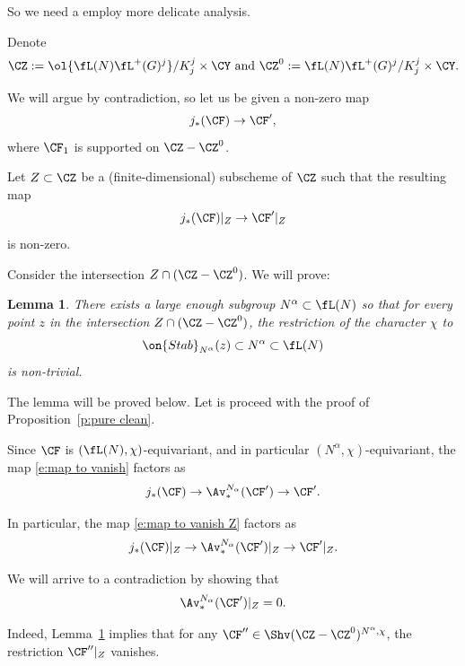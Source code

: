 \documentclass[9pt]{amsart}
\newtheorem{lem}[subsubsection]{Lemma}
\theoremstyle{definition}
\theoremstyle{remark}
\newcommand{\lemref}[1]{Lemma~\ref{#1}}
\newcommand{\propref}[1]{Proposition~\ref{#1}}
\numberwithin{equation}{section}
\begin{document}
So we need a employ more delicate analysis. 

\sssec{}
Denote 
$$\CZ:=\ol{\fL(N)\fL^+(G)^j}/K^j_j\times \CY \text{ and } \CZ^0:=\fL(N)\fL^+(G)^j/K^j_j\times \CY.$$


\medskip

We will argue by contradiction, so let us be given a non-zero map
\begin{equation} \label{e:map to vanish}
j_*(\CF)\to \CF',
\end{equation}
where $\CF_1$ is supported on $\CZ-\CZ^0$.

\medskip

Let $Z\subset \CZ$ be a (finite-dimensional) subscheme of $\CZ$ such that the resulting map
\begin{equation} \label{e:map to vanish Z}
j_*(\CF)|_Z\to \CF'|_Z
\end{equation}
is non-zero. 

\medskip

Consider the intersection $Z\cap (\CZ-\CZ^0)$. We will prove:

\begin{lem} \label{l:character non-trivial}
There exists a large enough subgroup $N^\alpha\subset \fL(N)$ so that for every point $z$ in the intersection $Z\cap (\CZ-\CZ^0)$,
the restriction of the character $\chi$ to
$$\on{Stab}_{N^\alpha}(z)\subset N^\alpha\subset \fL(N)$$
is non-trivial. 
\end{lem}

The lemma will be proved below. Let is proceed with the proof of \propref{p:pure clean}.

\sssec{}
 
Since $\CF$ is $(\fL(N),\chi)$-equivariant, and in particular $(N^\alpha,\chi)$-equivariant, the map \eqref{e:map to vanish} factors
as $$j_*(\CF)\to \Av_*^{N_\alpha}(\CF')\to \CF'.$$

In particular, the map \eqref{e:map to vanish Z} factors as 
$$j_*(\CF)|_Z\to \Av_*^{N_\alpha}(\CF')|_Z\to \CF'|_Z.$$

\medskip

We will arrive to a contradiction by showing that 
$$\Av_*^{N_\alpha}(\CF')|_Z=0.$$

Indeed, \lemref{l:character non-trivial} implies that for any $\CF''\in \Shv(\CZ-\CZ^0)^{N^\alpha,\chi}$, the restriction $\CF''|_Z$ vanishes. 
\end{document}
